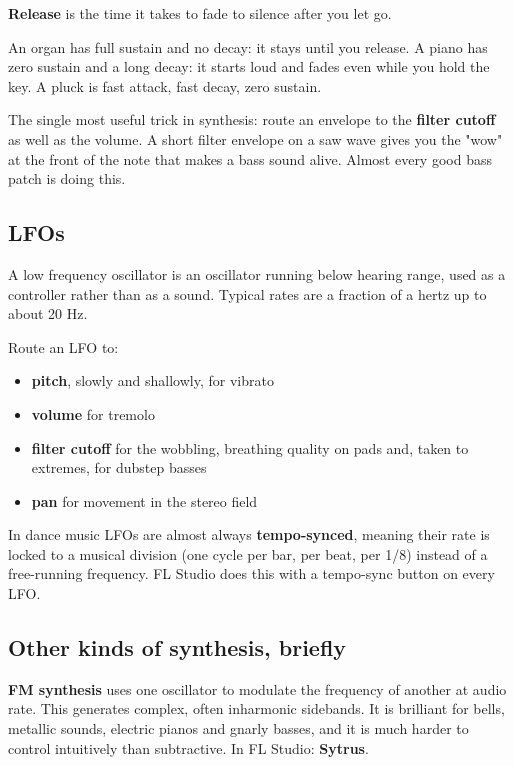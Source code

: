 \textbf{Release} is the time it takes to fade to silence after you let go.

An organ has full sustain and no decay: it stays until you release. A piano has zero sustain
and a long decay: it starts loud and fades even while you hold the key. A pluck is fast
attack, fast decay, zero sustain.

The single most useful trick in synthesis: route an envelope to the \textbf{filter cutoff} as
well as the volume. A short filter envelope on a saw wave gives you the "wow" at the front
of the note that makes a bass sound alive. Almost every good bass patch is doing this.

\subsection{LFOs}\label{th05_sound_design-lfos}

A low frequency oscillator is an oscillator running below hearing range, used as a
controller rather than as a sound. Typical rates are a fraction of a hertz up to about 20 Hz.

Route an LFO to:

\begin{itemize}
\tightlist
\item
  \textbf{pitch}, slowly and shallowly, for vibrato
\item
  \textbf{volume} for tremolo
\item
  \textbf{filter cutoff} for the wobbling, breathing quality on pads and, taken to extremes, for
  dubstep basses
\item
  \textbf{pan} for movement in the stereo field
\end{itemize}

In dance music LFOs are almost always \textbf{tempo-synced}, meaning their rate is locked to a
musical division (one cycle per bar, per beat, per 1/8) instead of a free-running frequency.
FL Studio does this with a tempo-sync button on every LFO.

\subsection{Other kinds of synthesis, briefly}\label{th05_sound_design-other-kinds-of-synthesis-briefly}

\textbf{FM synthesis} uses one oscillator to modulate the frequency of another at audio rate.
This generates complex, often inharmonic sidebands. It is brilliant for bells, metallic
sounds, electric pianos and gnarly basses, and it is much harder to control intuitively than
subtractive. In FL Studio: \textbf{Sytrus}.

